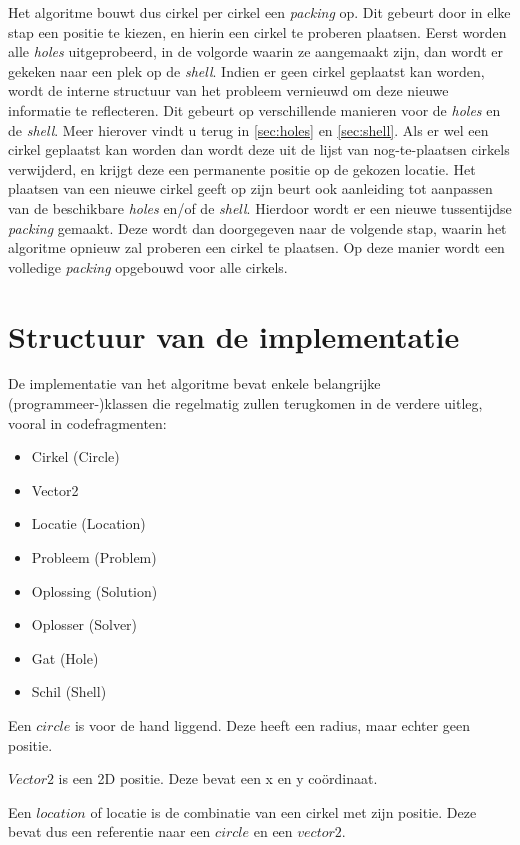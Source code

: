 \documentclass[12pt,a4paper,oneside]{book}
\begin{document}
Het algoritme bouwt dus cirkel per cirkel een \textit{packing} op.
Dit gebeurt door in elke stap een positie te kiezen, en hierin een cirkel te proberen plaatsen.
Eerst worden alle \textit{holes} uitgeprobeerd, in de volgorde waarin ze aangemaakt zijn, dan wordt er gekeken naar een plek op de \textit{shell}.
Indien er geen cirkel geplaatst kan worden, wordt de interne structuur van het probleem vernieuwd om deze nieuwe informatie te reflecteren.
Dit gebeurt op verschillende manieren voor de \textit{holes} en de \textit{shell}.
Meer hierover vindt u terug in \autoref{sec:holes} en \autoref{sec:shell}.
Als er wel een cirkel geplaatst kan worden dan wordt deze uit de lijst van nog-te-plaatsen cirkels verwijderd, en krijgt deze een permanente positie op de gekozen locatie.
Het plaatsen van een nieuwe cirkel geeft op zijn beurt ook aanleiding tot aanpassen van de beschikbare \textit{holes} en/of de \textit{shell}.
Hierdoor wordt er een nieuwe tussentijdse \textit{packing} gemaakt.
Deze wordt dan doorgegeven naar de volgende stap, waarin het algoritme opnieuw zal proberen een cirkel te plaatsen.
Op deze manier wordt een volledige \textit{packing} opgebouwd voor alle cirkels.

\section{Structuur van de implementatie}

De implementatie van het algoritme bevat enkele belangrijke (programmeer-)klassen die regelmatig zullen terugkomen in de verdere uitleg, vooral in codefragmenten:

\begin{itemize} 
\item Cirkel (Circle)
\item Vector2
\item Locatie (Location)
\item Probleem (Problem)
\item Oplossing (Solution)
\item Oplosser (Solver)
\item Gat (Hole)
\item Schil (Shell)
\end{itemize}

Een $circle$ is voor de hand liggend. Deze heeft een radius, maar echter geen positie.

$Vector2$ is een 2D positie. Deze bevat een x en y coördinaat.

Een $location$ of locatie is de combinatie van een cirkel met zijn positie. Deze bevat dus een referentie naar een $circle$ en een $vector2$.
\end{document}
